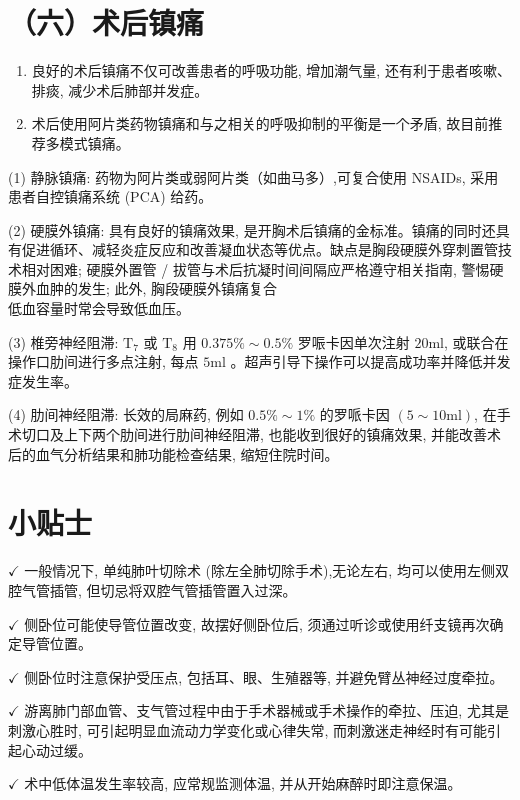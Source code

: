 \documentclass[10pt]{article}
\begin{document}
\section*{（六）术后镇痛}
\begin{enumerate}
  \item 良好的术后镇痛不仅可改善患者的呼吸功能, 增加潮气量, 还有利于患者咳嗽、排痰, 减少术后肺部并发症。

  \item 术后使用阿片类药物镇痛和与之相关的呼吸抑制的平衡是一个矛盾, 故目前推荐多模式镇痛。

\end{enumerate}

(1) 静脉镇痛: 药物为阿片类或弱阿片类（如曲马多）,可复合使用 NSAIDs, 采用患者自控镇痛系统 (PCA) 给药。

(2) 硬膜外镇痛: 具有良好的镇痛效果, 是开胸术后镇痛的金标准。镇痛的同时还具有促进循环、减轻炎症反应和改善凝血状态等优点。缺点是胸段硬膜外穿刺置管技术相对困难; 硬膜外置管 / 拔管与术后抗凝时间间隔应严格遵守相关指南, 警惕硬膜外血肿的发生; 此外, 胸段硬膜外镇痛复合\\
低血容量时常会导致低血压。

(3) 椎旁神经阻滞: $\mathrm{T}_{7}$ 或 $\mathrm{T}_{8}$ 用 $0.375 \% \sim 0.5 \%$ 罗㖘卡因单次注射 $20 \mathrm{ml}$, 或联合在操作口肋间进行多点注射, 每点 $5 \mathrm{ml}$ 。超声引导下操作可以提高成功率并降低并发症发生率。

(4) 肋间神经阻滞: 长效的局麻药, 例如 $0.5 \% \sim 1 \%$ 的罗哌卡因 $(5 \sim 10 \mathrm{ml})$, 在手术切口及上下两个肋间进行肋间神经阻滞, 也能收到很好的镇痛效果, 并能改善术后的血气分析结果和肺功能检查结果, 缩短住院时间。

\section*{小贴士}
$\checkmark$ 一般情况下, 单纯肺叶切除术 (除左全肺切除手术),无论左右, 均可以使用左侧双腔气管插管, 但切忌将双腔气管插管置入过深。

$\checkmark$ 侧卧位可能使导管位置改变, 故摆好侧卧位后, 须通过听诊或使用纤支镜再次确定导管位置。

$\checkmark$ 侧卧位时注意保护受压点, 包括耳、眼、生殖器等, 并避免臂丛神经过度牵拉。

$\checkmark$ 游离肺门部血管、支气管过程中由于手术器械或手术操作的牵拉、压迫, 尤其是刺激心胜时, 可引起明显血流动力学变化或心律失常, 而刺激迷走神经时有可能引起心动过缓。

$\checkmark$ 术中低体温发生率较高, 应常规监测体温, 并从开始麻醉时即注意保温。
\end{document}
